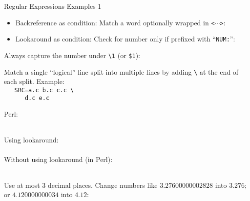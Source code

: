 \documentclass[11pt, a4paper, landscape]{scrartcl}
\newcommand{\regex}[1]{\texttt{#1}}
\newcommand{\code}[1]{\texttt{#1}}
\newcommand{\bs}{\textbackslash}
\begin{document}
\begin{cheatsheet}{Regular Expressions Examples 1}

\begin{col1}


\begin{itemize}
	\item Backreference as condition: Match a word optionally wrapped in \code{<$\cdots$>}:\\
	\regex{}
	\item Lookaround as condition: Check for number only if prefixed with ``\code{NUM:}'':\\
	\regex{}
\end{itemize}


Always capture the number under \regex{\bs{}1} (or \regex{\$1}):\\
\regex{}


Match a single ``logical'' line split into multiple lines by adding \regex{\bs}
at the end of each split. Example:\\
\texttt{%
\mbox{}\ \ SRC=a.c b.c c.c \bs\\
\mbox{}\ \ \ \ \ \ d.c e.c}

\regex{}

\end{col1}

\begin{col2}


Perl:\\
\regex{}\\


Using lookaround:\\
\regex{}\\

Without using lookaround (in Perl):\\
\regex{}\\


Use at most $3$ decimal places. Change numbers like $3.27600000002828$ into
$3.276$; or $4.120000000034$ into $4.12$:\\
\regex{}\\


\end{col2}
\end{cheatsheet}
\end{document}
